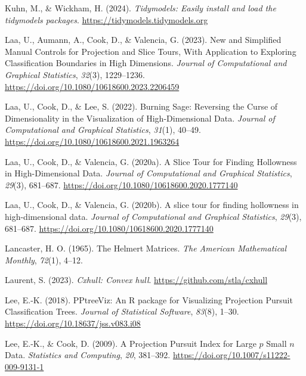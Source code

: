 \documentclass[
  letterpaper,
]{krantz}
\newlength{\cslhangindent}
\newenvironment{CSLReferences}[2] %
 {\begin{list}{}{%
  \setlength{\itemindent}{0pt}
  \setlength{\leftmargin}{0pt}
  \setlength{\parsep}{0pt}
  \ifodd #1
   \setlength{\leftmargin}{\cslhangindent}
   \setlength{\itemindent}{-1\cslhangindent}
  \fi
  \setlength{\itemsep}{#2\baselineskip}}}
 {\end{list}}
\begin{document}
\begin{CSLReferences}{1}{0}
Kuhn, M., \& Wickham, H. (2024). \emph{Tidymodels: Easily install and
load the tidymodels packages}. \url{https://tidymodels.tidymodels.org}

Laa, U., Aumann, A., Cook, D., \& Valencia, G. (2023). New and
{S}implified {M}anual {C}ontrols for {P}rojection and {S}lice {T}ours,
{W}ith {A}pplication to {E}xploring {C}lassification {B}oundaries in
{H}igh {D}imensions. \emph{Journal of Computational and Graphical
Statistics}, \emph{32}(3), 1229--1236.
\url{https://doi.org/10.1080/10618600.2023.2206459}

Laa, U., Cook, D., \& Lee, S. (2022). Burning {S}age: {R}eversing the
{C}urse of {D}imensionality in the {V}isualization of
{H}igh-{D}imensional {D}ata. \emph{Journal of Computational and
Graphical Statistics}, \emph{31}(1), 40--49.
\url{https://doi.org/10.1080/10618600.2021.1963264}

Laa, U., Cook, D., \& Valencia, G. (2020a). A {S}lice {T}our for
{F}inding {H}ollowness in {H}igh-{D}imensional {D}ata. \emph{Journal of
Computational and Graphical Statistics}, \emph{29}(3), 681--687.
\url{https://doi.org/10.1080/10618600.2020.1777140}

Laa, U., Cook, D., \& Valencia, G. (2020b). A slice tour for finding
hollowness in high-dimensional data. \emph{Journal of Computational and
Graphical Statistics}, \emph{29}(3), 681--687.
\url{https://doi.org/10.1080/10618600.2020.1777140}

Lancaster, H. O. (1965). The {H}elmert {M}atrices. \emph{The American
Mathematical Monthly}, \emph{72}(1), 4--12.

Laurent, S. (2023). \emph{Cxhull: Convex hull}.
\url{https://github.com/stla/cxhull}

Lee, E.-K. (2018). PPtreeViz: An {R} package for {V}isualizing
{P}rojection {P}ursuit {C}lassification {T}rees. \emph{Journal of
Statistical Software}, \emph{83}(8), 1--30.
\url{https://doi.org/10.18637/jss.v083.i08}

Lee, E.-K., \& Cook, D. (2009). A {P}rojection {P}ursuit {I}ndex for
{L}arge \(p\) {S}mall \(n\) {D}ata. \emph{Statistics and Computing},
\emph{20}, 381--392. \url{https://doi.org/10.1007/s11222-009-9131-1}


\end{CSLReferences}
\end{document}
